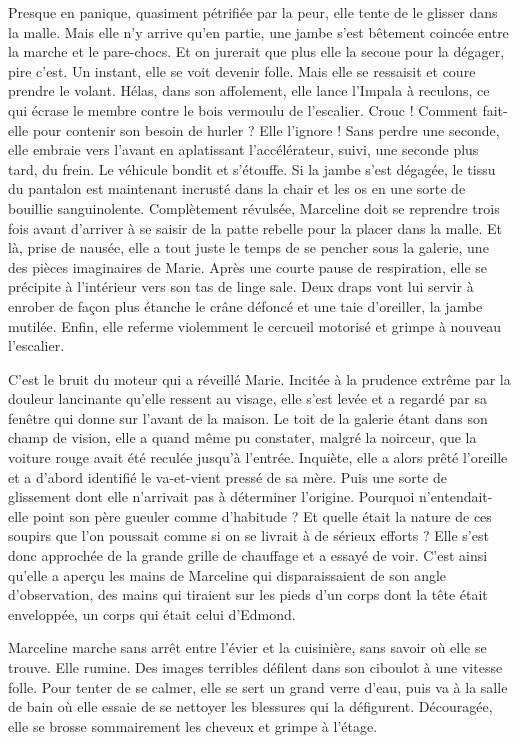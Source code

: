 Presque en panique, quasiment pétrifiée par la peur, elle tente de le glisser dans la malle. Mais elle n’y arrive qu’en partie, une jambe s’est bêtement coincée entre la marche et le pare-chocs. Et on jurerait que plus elle la secoue pour la dégager, pire c’est. Un instant, elle se voit devenir folle. Mais elle se ressaisit et coure prendre le volant. Hélas, dans son affolement, elle lance l’Impala à reculons, ce qui écrase le membre contre le bois vermoulu de l’escalier. Crouc ! Comment fait-elle pour contenir son besoin de hurler ? Elle l’ignore ! Sans perdre une seconde, elle embraie vers l’avant en aplatissant l’accélérateur, suivi, une seconde plus tard, du frein. Le véhicule bondit et s’étouffe. Si la jambe s’est dégagée, le tissu du pantalon est maintenant incrusté dans la chair et les os en une sorte de bouillie sanguinolente. Complètement révulsée, Marceline doit se reprendre trois fois avant d’arriver à se saisir de la patte rebelle pour la placer dans la malle. Et là, prise de nausée, elle a tout juste le temps de se pencher sous la galerie, une des pièces imaginaires de Marie. Après une courte pause de respiration, elle se précipite à l’intérieur vers son tas de linge sale. Deux draps vont lui servir à enrober de façon plus étanche le crâne défoncé et une taie d’oreiller, la jambe mutilée. Enfin, elle referme violemment le cercueil motorisé et grimpe à nouveau l’escalier.

C’est le bruit du moteur qui a réveillé Marie. Incitée à la prudence extrême par la douleur lancinante qu’elle ressent au visage, elle s’est levée et a regardé par sa fenêtre qui donne sur l’avant de la maison. Le toit de la galerie étant dans son champ de vision, elle a quand même pu constater, malgré la noirceur, que la voiture rouge avait été reculée jusqu’à l’entrée. Inquiète, elle a alors prêté l’oreille et a d’abord identifié le va-et-vient pressé de sa mère. Puis une sorte de glissement dont elle n’arrivait pas à déterminer l’origine. Pourquoi n’entendait-elle point son père gueuler comme d’habitude ? Et quelle était la nature de ces soupirs que l’on poussait comme si on se livrait à de sérieux efforts ? Elle s’est donc approchée de la grande grille de chauffage et a essayé de voir. C’est ainsi qu’elle a aperçu les mains de Marceline qui disparaissaient de son angle d’observation, des mains qui tiraient sur les pieds d’un corps dont la tête était enveloppée, un corps qui était celui d’Edmond.

Marceline marche sans arrêt entre l’évier et la cuisinière, sans savoir où elle se trouve. Elle rumine. Des images terribles défilent dans son ciboulot à une vitesse folle. Pour tenter de se calmer, elle se sert un grand verre d’eau, puis va à la salle de bain où elle essaie de se nettoyer les blessures qui la défigurent. Découragée, elle se brosse sommairement les cheveux et grimpe à l’étage.

